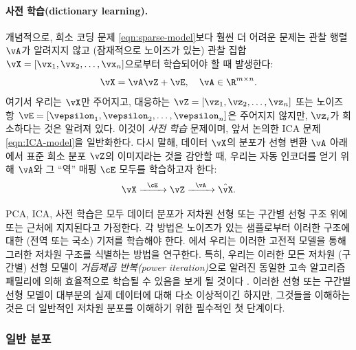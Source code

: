 \documentclass[../../book-main_ko.tex]{subfiles}
\begin{document}
\paragraph{사전 학습(dictionary learning).}
개념적으로, 희소 코딩 문제 \eqref{eqn:sparse-model}보다 훨씬 더 어려운 문제는 관찰 행렬 \(\vA\)가 알려지지 않고 (잠재적으로 노이즈가 있는) 관찰 집합 \(\vX = [\vx_{1}, \vx_{2}, \ldots, \vx_{n}]\)으로부터 학습되어야 할 때 발생한다:
\begin{equation}
    \vX = \vA \vZ + \vE, \quad \vA \in \R^{m\times n}.
    \label{eqn:dictionary-learning}
\end{equation}
여기서 우리는 \(\vX\)만 주어지고, 대응하는 \(\vZ = [\vz_{1}, \vz_{2}, \ldots, \vz_{n}]\) 또는 노이즈 항 \(\vE = [\vepsilon_{1}, \vepsilon_{2}, \ldots, \vepsilon_{n}]\)은 주어지지 않지만, \(\vz_{i}\)가 희소하다는 것은 알려져 있다. 이것이 \textit{사전 학습} 문제이며, 앞서 논의한 ICA 문제 \eqref{eqn:ICA-model}을 일반화한다. 다시 말해, 데이터 \(\vX\)의 분포가 선형 변환 \(\vA\) 아래에서 표준 희소 분포 \(\vZ\)의 이미지라는 것을 감안할 때, 우리는 자동 인코더를 얻기 위해 \(\vA\)와 그 ``역'' 매핑 \(\cE\) 모두를 학습하고자 한다:
\begin{equation}
    \vX   \xrightarrow{\hspace{2mm} \cE\hspace{2mm}}  \vZ \xrightarrow{\hspace{2mm} \vA \hspace{2mm}} \hat{\vX}.
       \label{eqn:decoding-DL}
\end{equation}

PCA, ICA, 사전 학습은 모두 데이터 분포가 저차원 선형 또는 구간별 선형 구조 위에 또는 근처에 지지된다고 가정한다. 각 방법은 노이즈가 있는 샘플로부터 이러한 구조에 대한 (전역 또는 국소) 기저를 학습해야 한다. 에서 우리는 이러한 고전적 모델을 통해 그러한 저차원 구조를 식별하는 방법을 연구한다. 특히, 우리는 이러한 모든 저차원 (구간별) 선형 모델이 \textit{거듭제곱 반복(power iteration)}으로 알려진 동일한 고속 알고리즘 패밀리에 의해 효율적으로 학습될 수 있음을 보게 될 것이다 \cite{Zhai-2020}. 이러한 선형 또는 구간별 선형 모델이 대부분의 실제 데이터에 대해 다소 이상적이긴 하지만, 그것들을 이해하는 것은 더 일반적인 저차원 분포를 이해하기 위한 필수적인 첫 단계이다.

\subsubsection{일반 분포}\label{sec:denoising-intro}
\end{document}
